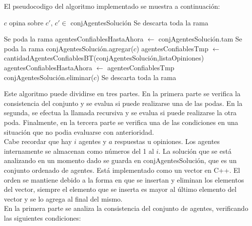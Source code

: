 \documentclass{article}
\begin{document}

El pseudocodigo del algoritmo implementado se muestra a continuación:

\begin{algorithm}
\begin{algorithmic}[1]
 
	 
		 
			\State $c$ opina sobre $c'$, $c' \in$ conjAgentesSolución				\EndIf
		 
			\State Se descarta toda la rama
		\EndIf

			 
				 				
					 
						\State Se poda la rama 			
					\EndIf
				\EndIf
			\EndIf
	\EndFor
\EndFor
\State agentesConfiablesHastaAhora $\gets$ conjAgentesSolución.tam 
 
		\State Se poda la rama 
	\EndIf
	\State conjAgentesSolución.agregar($c$) 
	\State agentesConfiablesTmp $\gets$ cantidadAgentesConfiablesBT(conjAgentesSolución,listaOpiniones)
	 
		\State agentesConfiablesHastaAhora $\gets$ agentesConfiablesTmp 
	\EndIf
	\State conjAgentesSolución.eliminar($c$) 
\EndFor
{} 
	 
		\State Se descarta toda la rama
	\EndIf
\EndIf
\EndFunction
\end{algorithmic}
\end{algorithm}

Este algoritmo puede dividirse en tres partes. En la primera parte se verifica la consistencia del conjunto y se evalua si puede realizarse una de las podas. En la segunda, se efectua la llamada recursiva y se evalua si puede realizarse la otra poda. Finalmente, en la tercera parte se verifica una de las condiciones en una situación que no podia evaluarse con anterioridad. \\
Cabe recordar que hay $i$ agentes y $a$ respuestas u opiniones. Los agentes internamente se almacenan como números del 1 al $i$. La solución que se está analizando en un momento dado se guarda en conjAgentesSolución, que es un conjunto ordenado de agentes. Está implementado como un vector en C++. El orden se mantiene debido a la forma en que se insertan y eliminan los elementos del vector, siempre el elemento que se inserta es mayor al último elemento del vector y se lo agrega al final del mismo. \\
En la primera parte se analiza la consistencia del conjunto de agentes, verificando las siguientes condiciones:
\end{document}
